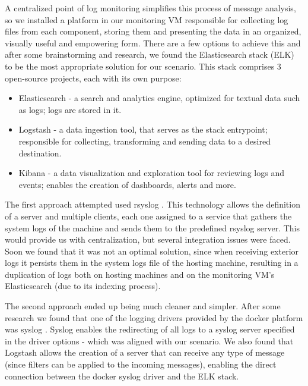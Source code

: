 \documentclass[12pt]{article}
\begin{document}
A centralized point of log monitoring simplifies this process of message analysis, so we installed a platform in our monitoring VM responsible for collecting 
log files from each component, storing them and presenting the data in an organized, visually useful and empowering form.
There are a few options to achieve this and after some brainstorming and research, we found the Elasticsearch stack (ELK) \cite{elk} to be the most appropriate 
solution for our scenario.
This stack comprises 3 open-source projects, each with its own purpose:

\vspace{-10pt}
\begin{itemize} [noitemsep]
  \item Elasticsearch - a search and analytics engine, optimized for textual data such as logs; logs are stored in it.
  \item Logstash - a data ingestion tool, that serves as the stack entrypoint; responsible for collecting, transforming and sending data to a desired destination.
  \item Kibana - a data visualization and exploration tool for reviewing logs and events; enables the creation of dashboards, alerts and more.
\end{itemize}
\vspace{-10pt}

The first approach attempted used rsyslog \cite{rsyslog}.
This technology allows the definition of a server and multiple clients, each one assigned to a service that gathers the system logs of the machine and sends 
them to the predefined rsyslog server.
This would provide us with centralization, but several integration issues were faced.
Soon we found that it was not an optimal solution, since when receiving exterior logs it persists them in the system logs file of the hosting machine, resulting 
in a duplication of logs both on hosting machines and on the monitoring VM's Elasticsearch (due to its indexing process).

The second approach ended up being much cleaner and simpler.
After some research we found that one of the logging drivers provided by the docker platform was syslog \cite{dockersyslog}.
Syslog enables the redirecting of all logs to a syslog server specified in the driver options - which was aligned with our scenario. 
We also found that Logstash allows the creation of a server that can receive any type of message (since filters can be applied to the incoming messages), 
enabling the direct connection between the docker syslog driver and the ELK stack.
\end{document}
